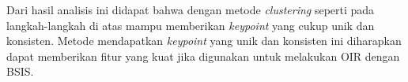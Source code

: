 Dari hasil analisis ini didapat bahwa dengan metode \textit{clustering} seperti pada langkah-langkah di atas mampu memberikan \textit{keypoint} yang cukup unik dan konsisten. Metode mendapatkan \textit{keypoint} yang unik dan konsisten ini diharapkan dapat memberikan fitur yang kuat jika digunakan untuk melakukan OIR dengan BSIS.

